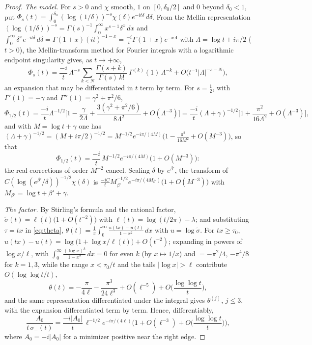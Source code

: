 \documentclass[11pt]{article}
\theoremstyle{definition}
\theoremstyle{remark}
\begin{document}
\begin{proof}
\emph{The model.} For $s>0$ and $\chi$ smooth, $1$ on $[0,\delta_0/2]$ and $0$ beyond $\delta_0<1$, put $\Phi_s(t)=\int_0^{\delta_0}(\log(1/\delta))^{-s}\chi(\delta)e^{-it\delta}\,d\delta$. From the Mellin representation $(\log(1/\delta))^{-s}=\Gamma(s)^{-1}\int_0^\infty x^{s-1}\delta^x\,dx$ and $\int_0^\infty\delta^xe^{-it\delta}\,d\delta=\Gamma(1+x)(it)^{-1-x}=\frac{-i}t\Gamma(1+x)e^{-x\Lambda}$ with $\Lambda=\log t+i\pi/2$ ($t>0$), the Mellin-transform method for Fourier integrals with a logarithmic endpoint singularity \cite[Ch.~4]{bleistein-handelsman} gives, as $t\to+\infty$,
\[
\Phi_s(t)=\frac{-i}{t}\,\Lambda^{-s}\sum_{k<N}\frac{\Gamma(s+k)}{\Gamma(s)\,k!}\,\Gamma^{(k)}(1)\,\Lambda^{-k}+O\big(t^{-1}|\Lambda|^{-s-N}\big),
\]
an expansion that may be differentiated in $t$ term by term. For $s=\frac12$, with $\Gamma'(1)=-\gamma$ and $\Gamma''(1)=\gamma^2+\pi^2/6$,
\[
\Phi_{1/2}(t)=\frac{-i}{t}\Lambda^{-1/2}\Big[1-\frac{\gamma}{2\Lambda}+\frac{3(\gamma^2+\pi^2/6)}{8\Lambda^2}+O(\Lambda^{-3})\Big]=\frac{-i}{t}(\Lambda+\gamma)^{-1/2}\Big[1+\frac{\pi^2}{16\Lambda^2}+O(\Lambda^{-3})\Big],
\]
and with $M=\log t+\gamma$ one has $(\Lambda+\gamma)^{-1/2}=(M+i\pi/2)^{-1/2}=M^{-1/2}e^{-i\pi/(4M)}\big(1-\frac{\pi^2}{16M^2}+O(M^{-3})\big)$, so that
\[
\Phi_{1/2}(t)=\frac{-i}t\,M^{-1/2}e^{-i\pi/(4M)}\big(1+O(M^{-3})\big):
\]
the real corrections of order $M^{-2}$ cancel. Scaling $\delta$ by $e^{\beta'}$, the transform of $C(\log(e^{\beta'}/\delta))^{-1/2}\chi(\delta)$ is $\frac{-iC}{t}M_{\beta'}^{-1/2}e^{-i\pi/(4M_{\beta'})}\big(1+O(M^{-3})\big)$ with $M_{\beta'}=\log t+\beta'+\gamma$.

\emph{The factor.} By Stirling's formula and the rational factor, $\tilde\sigma(t)=\ell(t)\big(1+O(t^{-2})\big)$ with $\ell(t)=\log(t/2\pi)-\lambda$; and substituting $\tau=tx$ in \eqref{eq:theta}, $\theta(t)=\frac1\pi\int_0^\infty\frac{u(tx)-u(t)}{1-x^2}\,dx$ with $u=\log\tilde\sigma$. For $tx\ge\tau_0$, $u(tx)-u(t)=\log\big(1+\log x/\ell(t)\big)+O(t^{-2})$; expanding in powers of $\log x/\ell$, with $\int_0^\infty\frac{(\log x)^k}{1-x^2}\,dx=0$ for even $k$ (by $x\mapsto1/x$) and $=-\pi^2/4$, $-\pi^4/8$ for $k=1,3$, while the range $x<\tau_0/t$ and the tails $|\log x|>\ell$ contribute $O(\log\log t/t)$,
\[
\theta(t)=-\frac\pi{4\ell}-\frac{\pi^3}{24\ell^3}+O(\ell^{-5})+O\Big(\frac{\log\log t}t\Big),
\]
and the same representation differentiated under the integral gives $\theta^{(j)}$, $j\le3$, with the expansion differentiated term by term. Hence, differentiably,
\[
\frac{A_0}{t\,\sigma_-(t)}=\frac{-i|A_0|}{t}\,\ell^{-1/2}e^{-i\pi/(4\ell)}\Big(1+O(\ell^{-3})+O\Big(\frac{\log\log t}t\Big)\Big),
\]
where $A_0=-i|A_0|$ for a minimizer positive near the right edge.


\end{proof}
\end{document}
